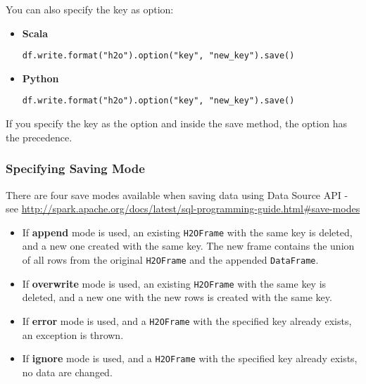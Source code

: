 \documentclass{standalone}
\begin{document}
    You can also specify the key as option:

    \begin{itemize}
        \item \textbf{Scala} \begin{lstlisting}[style=Scala]
df.write.format("h2o").option("key", "new_key").save()
        \end{lstlisting}
        \item \textbf{Python} \begin{lstlisting}[style=Python]
df.write.format("h2o").option("key", "new_key").save()
        \end{lstlisting}
    \end{itemize}

    If you specify the key as the option and inside the save method, the option
    has the precedence.

    \subsubsection{Specifying Saving Mode}

    There are four save modes available when saving data using Data Source
    API - see \url{http://spark.apache.org/docs/latest/sql-programming-guide.html#save-modes}

    \begin{itemize}
        \item If \textbf{append} mode is used, an existing \texttt{H2OFrame} with the same key is deleted, and a new one created with the same key. The new frame contains the union of all rows from the original \texttt{H2OFrame} and the appended \texttt{DataFrame}.
        \item If \textbf{overwrite} mode is used, an existing \texttt{H2OFrame} with the same key is deleted, and a new one with the new rows is created with the same key.
        \item If \textbf{error} mode is used, and a \texttt{H2OFrame} with the specified key already exists, an exception is thrown.
        \item If \textbf{ignore} mode is used, and a \texttt{H2OFrame} with the specified key already exists, no data are changed.
    \end{itemize}
\end{document}
